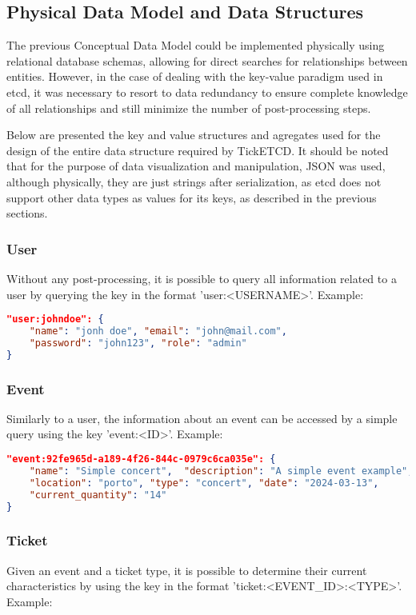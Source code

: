 \documentclass[screen,review]{acmart}
\begin{document}
\subsection{Physical Data Model and Data Structures}
The previous Conceptual Data Model could be implemented physically using relational database schemas, allowing for direct searches for relationships between entities. However, in the case of dealing with the key-value paradigm used in etcd, it was necessary to resort to data redundancy to ensure complete knowledge of all relationships and still minimize the number of post-processing steps.

Below are presented the key and value structures and agregates used for the design of the entire data structure required by TickETCD. It should be noted that for the purpose of data visualization and manipulation, JSON was used, although physically, they are just strings after serialization, as etcd does not support other data types as values for its keys, as described in the previous sections.

\subsubsection{User}
Without any post-processing, it is possible to query all information related to a user by querying the key in the format 'user:<USERNAME>'. Example:

\begin{lstlisting}[language=json]
"user:johndoe": { 
    "name": "jonh doe", "email": "john@mail.com", 
    "password": "john123", "role": "admin"
}
\end{lstlisting}

\subsubsection{Event}
Similarly to a user, the information about an event can be accessed by a simple query using the key 'event:<ID>'. Example:

\begin{lstlisting}[language=json]
"event:92fe965d-a189-4f26-844c-0979c6ca035e": {
    "name": "Simple concert",  "description": "A simple event example", 
    "location": "porto", "type": "concert", "date": "2024-03-13",
    "current_quantity": "14"
}
\end{lstlisting}

\subsubsection{Ticket}
Given an event and a ticket type, it is possible to determine their current characteristics by using the key in the format 'ticket:<EVENT\_ID>:<TYPE>'. Example:
\end{document}
